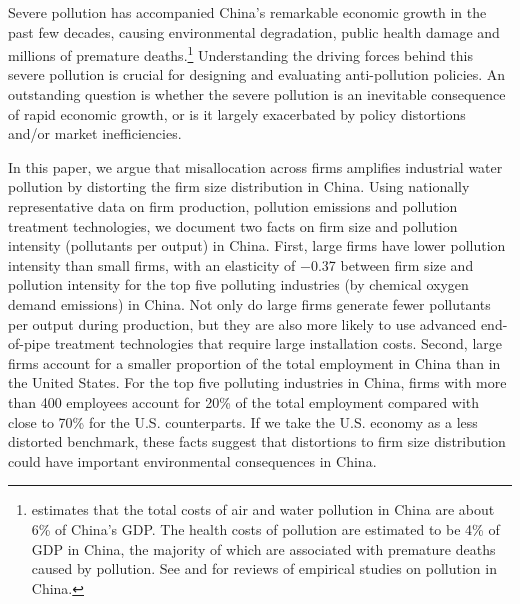 \documentclass[AEJ]{AEA}
\begin{document}
\maketitle

Severe pollution has accompanied China's remarkable economic growth in the past few decades, causing environmental degradation, public health damage and millions of premature deaths.\footnote{\citet{WorldBank_Cost_2007} estimates that the total costs of air and water pollution in China are about 6\% of China's GDP. The health costs of pollution are estimated to be 4\% of GDP in China, the majority of which are associated with premature deaths caused by pollution. See \citet{Vennemoetal:2009} and \citet{ZhengKahn:2013} for reviews of empirical studies on pollution in China.} Understanding the driving forces behind this severe pollution is crucial for designing and evaluating anti-pollution policies. An outstanding question is whether the severe pollution is an inevitable consequence of rapid economic growth, or is it largely exacerbated by policy distortions and/or market inefficiencies.

In this paper, we argue that misallocation across firms amplifies industrial water pollution by distorting the firm size distribution in China. Using nationally representative data on firm production, pollution emissions and pollution treatment technologies, we document two facts on firm size and pollution intensity (pollutants per output) in China. First, large firms have lower pollution intensity than small firms, with an elasticity of $-$0.37 between firm size and pollution intensity for the top five polluting industries (by chemical oxygen demand emissions) in China. Not only do large firms generate  fewer pollutants per output during production, but they are also more likely to use advanced end-of-pipe treatment technologies that require large installation costs. Second, large firms account for a smaller proportion of the total employment in China than in the United States. For the top five polluting industries in China, firms with more than 400 employees account for 20\% of the total employment compared with close to 70\% for the U.S. counterparts. If we take the U.S. economy as a less distorted benchmark, these facts suggest that distortions to firm size distribution could have important environmental consequences in China.
\end{document}
